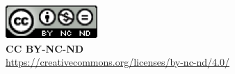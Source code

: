






\noindent
\includegraphics[]{images/CCBYNCND.png}
\\
\textbf{CC BY-NC-ND}
\\
\url{https://creativecommons.org/licenses/by-nc-nd/4.0/}

\setlength{\parskip}{0em}